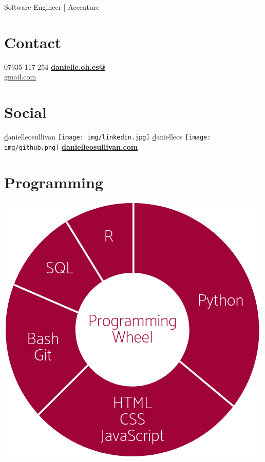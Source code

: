 \documentclass[]{friggeri-cv}
\begin{document}
      {\-\hspace{-1.9cm} Software Engineer | Accenture}
      

\begin{aside}
    \section{Contact}
        07935 117 254
        \href{mailto:danielle.oh.es@gmail.com}{\textbf{danielle.oh.es@}\\gmail.com}
    ~
    \section{Social}
        \href{https://www.linkedin.com/in/danielleosullivan}danielleosullivan {\texttt{[image: img/linkedin.jpg]}}
        \href{https://github.com/danielleos}danielleos {\texttt{[image: img/github.png]}}
        \href{http://danielleosullivan.com}{\textbf{danielleosullivan.com}}
    ~
    \section{Programming}
        \includegraphics[scale=0.25]{img/programmingwheel.png}
    ~

\end{aside}
\end{document}
